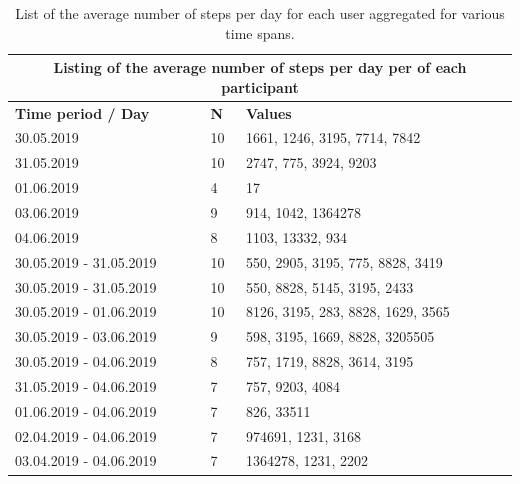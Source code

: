 \begin{table}[]
	\centering
	\begin{tabular}{|l|l|l|}
		\hline
		\multicolumn{3}{|c|}{\textbf{Listing of the average number of steps per day per of each participant}} \\ \hline
		\textbf{Time period / Day}         & \textbf{N}        & \textbf{Values}                          \\ \hline
		30.05.2019                         & 10                & 1661, 1246, 3195, 7714, 7842             \\ \hline
		31.05.2019                         & 10                & 2747, 775, 3924, 9203                    \\ \hline
		01.06.2019                         & 4                 & 17                                       \\ \hline
		03.06.2019                         & 9                 & 914, 1042, 1364278                       \\ \hline
		04.06.2019                         & 8                 & 1103, 13332, 934                         \\ \hline
		30.05.2019 - 31.05.2019            & 10                & 550, 2905, 3195, 775, 8828, 3419        \\ \hline
		30.05.2019 - 31.05.2019            & 10                & 550, 8828, 5145, 3195, 2433              \\ \hline
		30.05.2019 - 01.06.2019            & 10                & 8126, 3195, 283, 8828, 1629, 3565        \\ \hline
		30.05.2019 - 03.06.2019            & 9                 & 598, 3195, 1669, 8828, 3205505           \\ \hline
		30.05.2019 - 04.06.2019            & 8                 & 757, 1719, 8828, 3614, 3195              \\ \hline
		31.05.2019 - 04.06.2019            & 7                 & 757, 9203, 4084                         \\ \hline
		01.06.2019 - 04.06.2019            & 7                 & 826, 33511                               \\ \hline
		02.04.2019 - 04.06.2019            & 7                 & 974691, 1231, 3168                       \\ \hline
		03.04.2019 - 04.06.2019            & 7                 & 1364278, 1231, 2202                      \\ \hline
	\end{tabular}
	\caption{List of the average number of steps per day for each user aggregated for various time spans.}
	\label{results-steps-listing}
\end{table}

